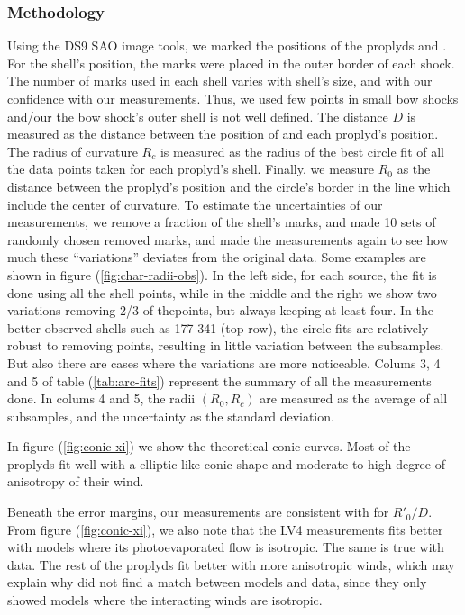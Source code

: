 \subsubsection{Methodology}
\label{sec:methodology}
Using the DS9 SAO image tools, we marked the positions of the proplyds and \thC{}. For the shell's position, the marks were placed in the outer border of each shock. 
The number of marks used in each shell varies with shell's size, and with our confidence with our measurements.
Thus, we used few points in small bow shocks and/our the bow shock's outer shell is not well defined. The distance $D$ is measured as the distance between the position of \thC{} 
and each proplyd's position. The radius of curvature $R_c$ is measured as the radius of the 
best circle fit of all the data points taken for each proplyd's shell. Finally, we measure $R_0$ as the distance between the proplyd's position and the circle's border in the line which 
include the center of curvature.
To estimate the uncertainties of our measurements, we remove a fraction of the shell's marks, and made 10 sets of randomly chosen removed marks, and made the measurements again to 
see how much these ``variations'' deviates from the original data. Some examples are shown  in figure (\ref{fig:char-radii-obs}).  In the left side, for each source, 
the fit is done using all the shell points, while in the middle and the right we show two variations removing 2/3 of thepoints, but always keeping at least four. 
In the better observed shells such as 177-341 (top row), the circle
fits are relatively robust to removing points, resulting in little variation between the subsamples. 
But also there are cases where the variations are more noticeable. Colums 3, 4 and 5 of table (\ref{tab:arc-fits}) represent the summary of all the measurements done. In colums 4 and 5, 
the radii $(R_0,R_c)$ are measured as the average of all subsamples, and the uncertainty as the standard deviation.

In figure (\ref{fig:conic-xi}) we show the theoretical conic curves. Most of the proplyds fit well 
with a elliptic-like conic shape and moderate to high degree of anisotropy of their wind.

Beneath the error margins, our measurements are consistent with \citet{Robberto:2005} for $R'_0/D$. From figure (\ref{fig:conic-xi}), we also
note that the LV4 measurements fits better with models where its photoevaporated flow is isotropic. The same is true with \citet{Robberto:2005} data.
The rest of the proplyds fit better with more anisotropic winds, which may explain why \citet{Robberto:2005} did not find a match between models
and data, since they only showed models where the interacting winds are isotropic.

